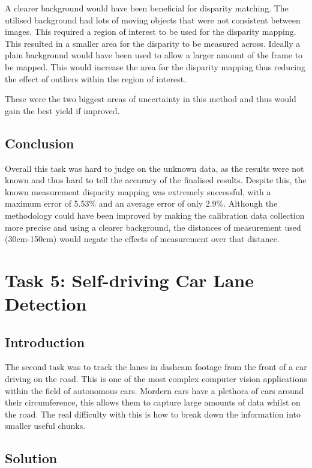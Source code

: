 \documentclass[conference]{IEEEtran}
\begin{document}
A clearer background would have been beneficial for disparity matching. The utilised background had lots of moving objects that were not consistent between images. This required a region of interest to be used for the disparity mapping. This resulted in a smaller area for the disparity to be measured across. Ideally a plain background would have been used to allow a larger amount of the frame to be mapped. This would increase the area for the disparity mapping thus reducing the effect of outliers within the region of interest. 

These were the two biggest areas of uncertainty in this method and thus would gain the best yield if improved.

\subsection{Conclusion}
Overall this task was hard to judge on the unknown data, as the results were not known and thus hard to tell the accuracy of the finalised results. Despite this, the known measurement disparity mapping was extremely successful, with a maximum error of 5.53\% and an average error of only 2.9\%. Although the methodology could have been improved by making the calibration data collection more precise and using a clearer background, the distances of measurement used (30cm-150cm) would negate the effects of measurement over that distance. 

\section{Task 5: Self-driving Car Lane Detection}
\subsection{Introduction}

The second task was to track the lanes in dashcam footage from the front of a car driving on the road. This is one of the most complex computer vision applications within the field of autonomous cars. Mordern cars have a plethora of cars around their circumference, this allows them to capture large amounts of data whilst on the road. The real difficulty with this is how to break down the information into smaller useful chunks.  

\subsection{Solution}
\end{document}
